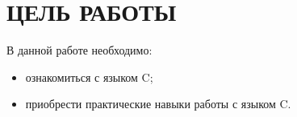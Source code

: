 
\section{ЦЕЛЬ РАБОТЫ}

В данной работе необходимо:

\begin{itemize} 
	\item ознакомиться с языком C;
	\item приобрести практические навыки работы с языком C.
\end{itemize}

\newpage